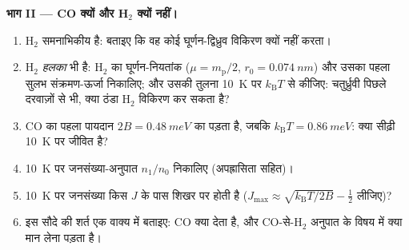\begin{problem}[{सप्ताहांत समस्या --- कार्बन मोनोऑक्साइड, रेडियो
खगोलिकी और ठंडा ब्रह्मांड}]
\medskip\noindent\textbf{भाग II --- CO क्यों और H$_2$ क्यों नहीं।}
\begin{enumerate}[resume]
  \item H$_2$ समनाभिकीय है: बताइए कि वह कोई घूर्णन-द्विध्रुव
        विकिरण क्यों नहीं करता।
  \item H$_2$ \emph{हलका} भी है: H$_2$ का घूर्णन-नियतांक
        ($\mu = m_{\text{p}}/2$, $r_0 = \qty{0.074}{nm}$)
        और उसका पहला सुलभ संक्रमण-ऊर्जा निकालिए; और उसकी तुलना
        \qty{10}{K} पर $k_{\text{B}}T$ से कीजिए: चतुर्ध्रुवी
        पिछले दरवाज़ों से भी, क्या ठंडा H$_2$ विकिरण कर सकता है?
  \item CO का पहला पायदान $2B = \qty{0.48}{meV}$ का पड़ता है, जबकि
        $k_{\text{B}}T = \qty{0.86}{meV}$: क्या सीढ़ी
        \qty{10}{K} पर जीवित है?
  \item \qty{10}{K} पर जनसंख्या-अनुपात $n_1/n_0$ निकालिए
        (अपह्रासिता सहित)।
  \item \qty{10}{K} पर जनसंख्या किस $J$ के पास शिखर पर होती है
        ($J_{\max} \approx \sqrt{k_{\text{B}}T/2B} - \tfrac12$ लीजिए)?
  \item इस सौदे की शर्त एक वाक्य में बताइए: CO क्या देता है, और
        CO-से-H$_2$ अनुपात के विषय में क्या मान लेना पड़ता है।
\end{enumerate}


\end{problem}
